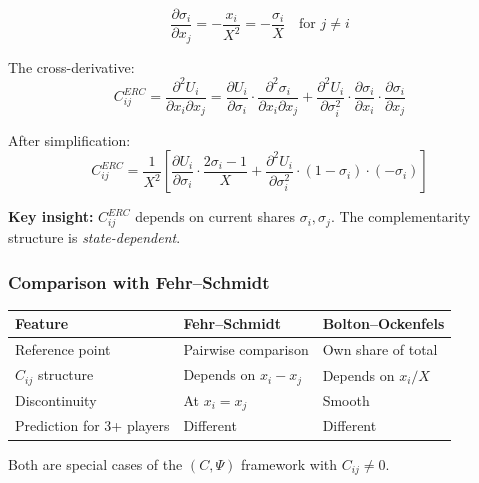 \begin{equation}
  \frac{\partial \sigma_i}{\partial x_j} = -\frac{x_i}{X^2} = -\frac{\sigma_i}{X}
  \quad \text{for } j \neq i
\end{equation}

The cross-derivative:
\begin{equation}
  C_{ij}^{ERC} = \frac{\partial^2 U_i}{\partial x_i \partial x_j}
               = \frac{\partial U_i}{\partial \sigma_i} \cdot \frac{\partial^2 \sigma_i}{\partial x_i \partial x_j}
               + \frac{\partial^2 U_i}{\partial \sigma_i^2} \cdot \frac{\partial \sigma_i}{\partial x_i} \cdot \frac{\partial \sigma_i}{\partial x_j}
\end{equation}

After simplification:
\begin{equation}
  C_{ij}^{ERC} = \frac{1}{X^2} \left[ 
    \frac{\partial U_i}{\partial \sigma_i} \cdot \frac{2\sigma_i - 1}{X}
    + \frac{\partial^2 U_i}{\partial \sigma_i^2} \cdot (1-\sigma_i) \cdot (-\sigma_i)
  \right]
\end{equation}

\textbf{Key insight:} $C_{ij}^{ERC}$ depends on current shares $\sigma_i, \sigma_j$.
The complementarity structure is \emph{state-dependent}.

\subsubsection{Comparison with Fehr--Schmidt}

\begin{center}
\renewcommand{\arraystretch}{1.3}
\begin{tabular}{lll}
\hline
\textbf{Feature} & \textbf{Fehr--Schmidt} & \textbf{Bolton--Ockenfels} \\
\hline
Reference point & Pairwise comparison & Own share of total \\
$C_{ij}$ structure & Depends on $x_i - x_j$ & Depends on $x_i / X$ \\
Discontinuity & At $x_i = x_j$ & Smooth \\
Prediction for 3+ players & Different & Different \\
\hline
\end{tabular}
\end{center}

Both are special cases of the $(C, \Psi)$ framework with $C_{ij} \neq 0$.

